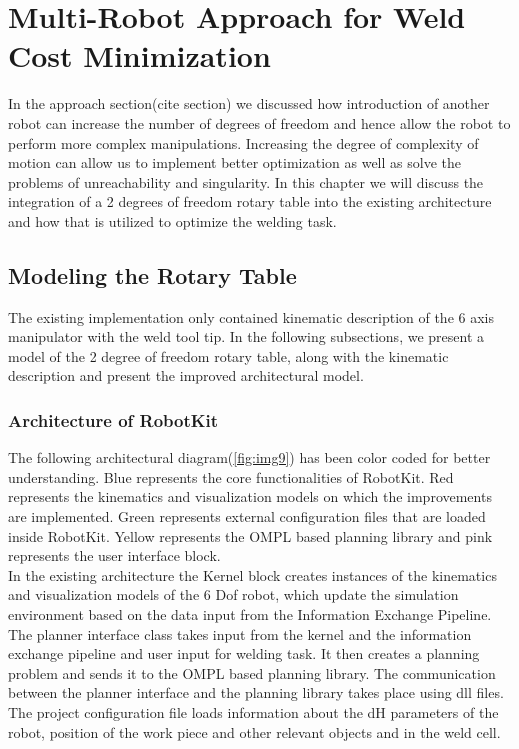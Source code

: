 \section{Multi-Robot Approach for Weld Cost Minimization}

In the approach section(cite section) we discussed how introduction of another robot can increase the number of degrees of freedom and hence allow the robot to perform more complex manipulations. Increasing the degree of complexity of motion can allow us to implement better optimization as well as solve the problems of unreachability and singularity. In this chapter we will discuss the integration of a 2 degrees of freedom rotary table into the existing architecture and how that is utilized to optimize the welding task. 

\subsection{Modeling the Rotary Table}
The existing implementation only contained kinematic description of the 6 axis manipulator with the weld tool tip. In the following subsections, we present a model of the 2 degree of freedom rotary table, along with the kinematic description and present the improved architectural model.
\subsubsection{Architecture of RobotKit}
The following architectural diagram(\ref{fig:img9}) has been color coded for better understanding. Blue represents the core functionalities of RobotKit. Red represents the kinematics and visualization models on which the improvements are implemented. Green represents external configuration files that are loaded inside RobotKit. Yellow represents the OMPL based planning library and pink represents the user interface block. \\
In the existing architecture the Kernel block creates instances of the kinematics and visualization models of the 6 Dof robot, which update the simulation environment based on the data input from the Information Exchange Pipeline. The planner interface class takes input from the kernel and the information exchange pipeline and user input for welding task. It then creates a planning problem and sends it to the OMPL based planning library. The communication between the planner interface and the planning library takes place using dll files. The project configuration file loads information about the dH parameters of the robot, position of the work piece and other relevant objects and in the weld cell. 

